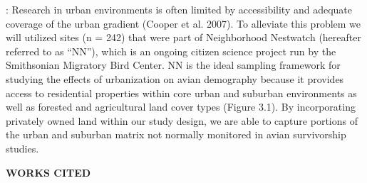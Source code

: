 \documentclass[12pt]{article}
\begin{document}
:
Research in urban environments is often limited by accessibility and adequate coverage of the urban gradient (Cooper et al. 2007). To alleviate this problem we will utilized sites (n = 242) that were part of Neighborhood Nestwatch (hereafter referred to as “NN”), which is an ongoing citizen science project run by the Smithsonian Migratory Bird Center. NN is the ideal sampling framework for studying the effects of urbanization on avian demography because it provides access to residential properties within core urban and suburban environments as well as forested and agricultural land cover types (Figure 3.1). By incorporating privately owned land within our study design, we are able to capture portions of the urban and suburban matrix not normally monitored in avian survivorship studies.

\noindent \begin{center} {\textbf {WORKS CITED}}\end{center} \par
\end{document}
